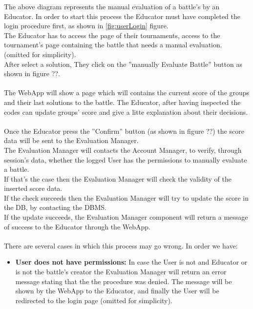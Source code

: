 \documentclass{article}
\begin{document}
{        \newpage
        The above diagram represents the manual evaluation of a battle’s by an Educator.
        In order to start this process the Educator must have completed the login procedure first, as shown in \ref{fig:userLogin}
        figure.\\ 
        The Educator has to access the page of their tournaments, access to the tournament's page containing the 
        battle that needs a manual evaluation. (omitted for simplicity).\\
        After select a solution, They click on the ”manually Evaluate Battle” button as shown in figure ??.\\
        \\
        The WebApp will show a page which will contains the current score of the groups and their last solutions to the battle.
        The Educator, after having inspected the codes can update groups' score and give a litte explanation
        about their decisions.
        \\ \\
        Once the Educator press the ”Confirm” button (as shown in figure ??) the score data will be sent to the Evaluation Manager.\\
        The Evaluation Manager will contacts the Account Manager, to verify, through
        session’s data, whether the logged User has the permissions to manually
        evaluate a battle.\\ If that’s the case then the Evaluation Manager will
        check the validity of the inserted score data.
        \\
        If the check succeeds then the Evaluation Manager will try to update the score
        in the DB, by contacting the DBMS.\\
        If the update succeeds, the Evaluation Manager component will return a message
        of success to the Educator through the WebApp.
        \\ \\
        There are several cases in which this process may go wrong. In order we have:
        \begin{itemize}
            \item \textbf{User does not have permissions:} In case the User is not and Educator
            or is not the battle’s creator the Evaluation Manager will return an error message 
            stating that the the procedure was denied. The message will be shown 
            by the WebApp to the Educator, and finally the User will be
            redirected to the login page (omitted for simplicity).

\end{itemize}}
\end{document}
